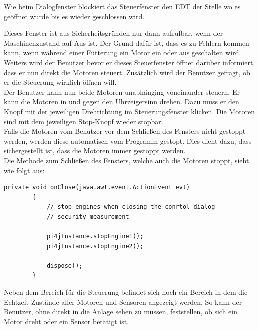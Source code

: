 \vspace{10pt}

Wie beim Dialogfenster blockiert das Steuerfenster den EDT der Stelle wo es geöffnet wurde bis es wieder geschlossen wird.

\vspace{10pt}

Dieses Fenster ist aus Sicherheitsgründen nur dann aufrufbar, wenn der Maschinenzustand auf Aus ist. Der Grund dafür ist, dass es zu Fehlern kommen kann, wenn während einer Fütterung ein Motor ein oder aus geschalten wird.
\\ Weiters wird der Benutzer bevor er dieses Steuerfenster öffnet darüber informiert, dass er nun direkt die Motoren steuert. Zusätzlich wird der Benutzer gefragt, ob er die Steuerung wirklich öffnen will.
\\ Der Benutzer kann nun beide Motoren unabhänging voneinander steuern. Er kann die Motoren in und gegen den Uhrzeigersinn drehen. Dazu muss er den Knopf mit der jeweiligen Drehrichtung im Steuerungsfenster klicken. Die Motoren sind mit dem jeweiligen Stop-Knopf wieder stopbar.
\\ Falls die Motoren vom Benutzer vor dem Schließen des Fensters nicht gestoppt werden, werden diese automatisch vom Programm gestopt. Dies dient dazu, dass sichergestellt ist, dass die Motoren immer gestoppt werden.
\\ Die Methode zum Schließen des Fensters, welche auch die Motoren stoppt, sieht wie folgt aus:
\begin{lstlisting}[style=JavaStyle, caption=Motoren stoppen und Fenster schließen]
	private void onClose(java.awt.event.ActionEvent evt)                                
    	{                                 
       		// stop engines when closing the conrtol dialog
       		// security measurement
       		
        	pi4jInstance.stopEngine1();
        	pi4jInstance.stopEngine2();
        
        	dispose();
    	} 
\end{lstlisting}

\vspace{10pt}

Neben dem Bereich für die Steuerung befindet sich noch ein Bereich in dem die Echtzeit-Zustände aller Motoren und Sensoren angezeigt werden. So kann der Benutzer, ohne direkt in die Anlage sehen zu müssen, feststellen, ob sich ein Motor dreht oder ein Sensor betätigt ist.

\vspace{10pt}

